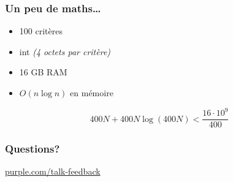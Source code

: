\begin{frame}
  \vfill

  \vfill
\end{frame}

\begin{frame}
  \frametitle{Un peu de maths\dots}

  \begin{itemize}
  \item 100 critères
  \item int \textit{(4 octets par critère)}
  \item 16 GB RAM
  \item $O(n\log n)$ en mémoire
  \end{itemize}

  \begin{displaymath}
    400 N + 400 N\log (400 N)
    < 
    \frac{16 \cdot 10^{9}}{400}
  \end{displaymath}

\end{frame}



\begin{frame}
  \frametitle{Questions?}
  \centerline{\large\url{purple.com/talk-feedback}}
\end{frame}


